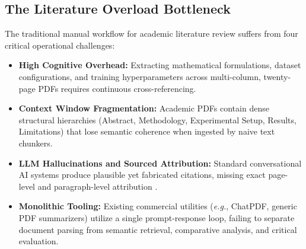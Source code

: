 \documentclass[conference]{IEEEtran}
\begin{document}
\subsection{The Literature Overload Bottleneck}
The traditional manual workflow for academic literature review suffers from four critical operational challenges:
\begin{itemize}
    \item \textbf{High Cognitive Overhead:} Extracting mathematical formulations, dataset configurations, and training hyperparameters across multi-column, twenty-page PDFs requires continuous cross-referencing.
    \item \textbf{Context Window Fragmentation:} Academic PDFs contain dense structural hierarchies (Abstract, Methodology, Experimental Setup, Results, Limitations) that lose semantic coherence when ingested by naive text chunkers.
    \item \textbf{LLM Hallucinations and Sourced Attribution:} Standard conversational AI systems produce plausible yet fabricated citations, missing exact page-level and paragraph-level attribution \cite{lewis2020rag}.
    \item \textbf{Monolithic Tooling:} Existing commercial utilities (\textit{e.g.}, ChatPDF, generic PDF summarizers) utilize a single prompt-response loop, failing to separate document parsing from semantic retrieval, comparative analysis, and critical evaluation.
\end{itemize}
\end{document}
